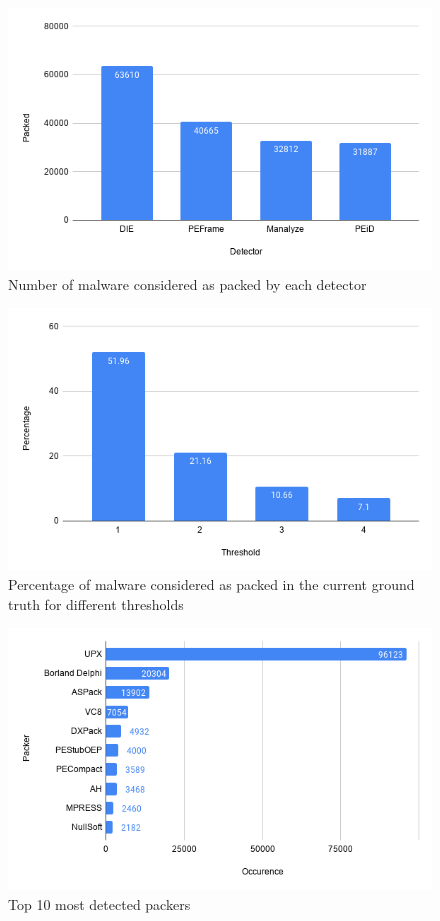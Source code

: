 \begin{appendix}
    \begin{figure}[!ht]
    \centering
      \includegraphics[width=0.80\linewidth]{Figures/detectors.png}
      \caption{Number of malware considered as packed by each detector}
      \label{fig:detectors}
    \end{figure}
    
    \begin{figure}[!ht]
    \centering
      \includegraphics[width=0.80\linewidth]{Figures/thresholds.png}
      \captionsetup{justification=centering}
      \caption{Percentage of malware considered as packed in the current ground truth for different thresholds}
      \label{fig:thresholds}
    \end{figure}
    
    \begin{figure}[!ht]
    \centering
      \includegraphics[width=0.80\linewidth]{Figures/packers.png}
      \caption{Top 10 most detected packers}
      \label{fig:packers}
    \end{figure}
    

\end{appendix}
